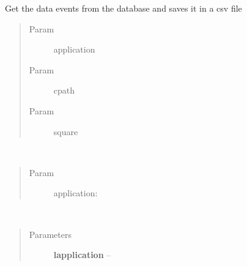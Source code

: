 \documentclass[letterpaper,10pt,english]{sphinxmanual}
\begin{document}

\begin{fulllineitems}
\label{index:SuperHubData.getApplicationData}
Get the data events from the database and saves it in a csv file
\begin{quote}\begin{description}
\item[{Param }] \leavevmode
application

\item[{Param }] \leavevmode
cpath

\item[{Param }] \leavevmode
square

\end{description}\end{quote}

\end{fulllineitems}


\begin{fulllineitems}
\label{index:SuperHubData.getApplicationDataOne}~\begin{quote}\begin{description}
\item[{Param }] \leavevmode
application:

\end{description}\end{quote}

\end{fulllineitems}


\begin{fulllineitems}
\label{index:SuperHubData.getLApplicationData}~\begin{quote}\begin{description}
\item[{Parameters}] \leavevmode
\textbf{lapplication} -- 

\end{description}\end{quote}

\end{fulllineitems}
\end{document}
